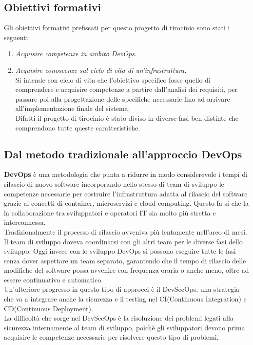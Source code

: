 \documentclass[a4paper,12pt]{report}
\begin{document}
\subsection{Obiettivi formativi}
Gli obiettivi formativi prefissati per questo progetto di tirocinio sono stati i seguenti:\\
\begin{enumerate}
\item \textit{Acquisire competenze in ambito DevOps.}
\item \textit{Acquisire conoscenze sul ciclo di vita di un'infrastruttura.}\\
Si intende con ciclo di vita che l'obiettivo specifico fosse quello di comprendere e acquisire competenze a partire dall'analisi dei requisiti, per passare poi alla progettazione delle specifiche necessarie fino ad arrivare all'implementazione finale del sistema.\\
Difatti il progetto di tirocinio è stato diviso in diverse fasi ben distinte che comprendono tutte queste caratteristiche.
\end{enumerate}
\subsection{Dal metodo tradizionale all'approccio DevOps}
\textbf{DevOps} è una metodologia che punta a ridurre in modo considerevole i tempi di rilascio di nuovo software incorporando nello stesso di team di sviluppo le competenze necessarie per costruire l'infrastruttura adatta al rilascio del software grazie ai concetti di container, microservizi e cloud computing. Questo fa si che la la collaborazione tra sviluppatori e operatori IT sia molto più stretta e interconnessa. \cite{defdevops}\\
Tradizionalmente il processo di rilascio avveniva più lentamente nell'arco di mesi. Il team di sviluppo doveva coordinarsi con gli altri team per le diverse fasi dello sviluppo. Oggi invece con lo sviluppo DevOps si possono eseguire tutte le fasi senza dover aspettare un team separato, garantendo che il tempo di rilascio delle modifiche del software possa avvenire con frequenza oraria o anche meno, oltre ad essere continuativo e automatico.\\
Un'ulteriore progresso in questo tipo di approcci è il DevSecOps, una strategia che va a integrare anche la sicurezza e il testing nel CI(Continuous Integration) e CD(Continuous Deployment). \\La difficoltà che sorge nel DevSecOps è la risoluzione dei problemi legati alla sicurezza internamente al team di sviluppo, poichè gli sviluppatori devono prima acquisire le competenze necessarie per risolvere questo tipo di problemi.\\
\end{document}
